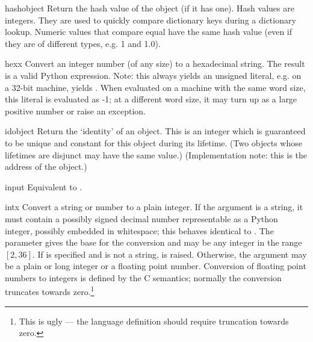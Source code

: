\begin{funcdesc}{hash}{object}
  Return the hash value of the object (if it has one).  Hash values
  are integers.  They are used to quickly compare dictionary
  keys during a dictionary lookup.  Numeric values that compare equal
  have the same hash value (even if they are of different types, e.g.
  1 and 1.0).
\end{funcdesc}

\begin{funcdesc}{hex}{x}
  Convert an integer number (of any size) to a hexadecimal string.
  The result is a valid Python expression.  Note: this always yields
  an unsigned literal, e.g. on a 32-bit machine,  yields
  .  When evaluated on a machine with the same
  word size, this literal is evaluated as -1; at a different word
  size, it may turn up as a large positive number or raise an
   exception.
\end{funcdesc}

\begin{funcdesc}{id}{object}
  Return the `identity' of an object.  This is an integer which is
  guaranteed to be unique and constant for this object during its
  lifetime.  (Two objects whose lifetimes are disjunct may have the
  same  value.)  (Implementation note: this is the
  address of the object.)
\end{funcdesc}

\begin{funcdesc}{input}{}
  Equivalent to .
\end{funcdesc}

\begin{funcdesc}{int}{x}
  Convert a string or number to a plain integer.  If the argument is a
  string, it must contain a possibly signed decimal number
  representable as a Python integer, possibly embedded in whitespace;
  this behaves identical to .  The  parameter gives the base for the
  conversion and may be any integer in the range $[2, 36]$.  If
   is specified and  is not a string,
   is raised.
  Otherwise, the argument may be a plain or
  long integer or a floating point number.  Conversion of floating
  point numbers to integers is defined by the C semantics; normally
  the conversion truncates towards zero.\footnote{This is ugly --- the
  language definition should require truncation towards zero.}
\end{funcdesc}

